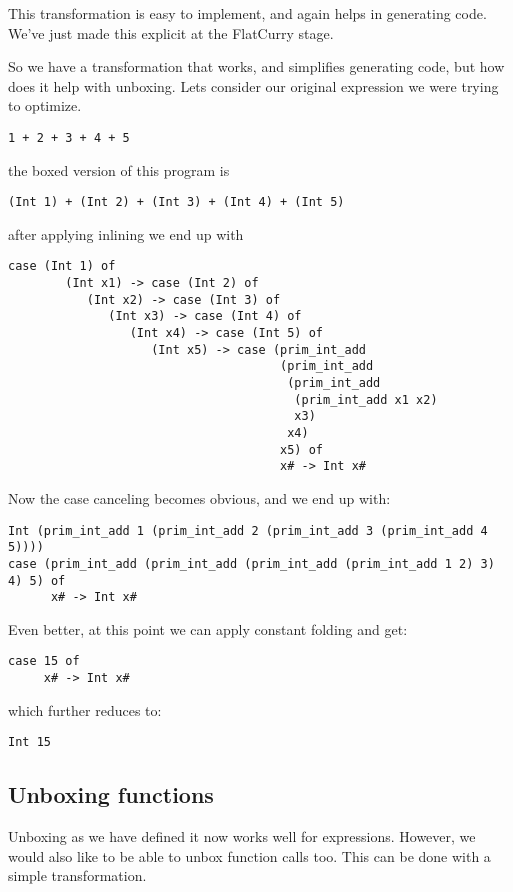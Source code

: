 \documentclass{article}
\begin{document}
This transformation is easy to implement, and again helps in generating code.
We've just made this explicit at the FlatCurry stage.

So we have a transformation that works, and simplifies generating code, but how does it help with unboxing.
Lets consider our original expression we were trying to optimize.


\begin{verbatim}
1 + 2 + 3 + 4 + 5
\end{verbatim}
the boxed version of this program is
\begin{verbatim}
(Int 1) + (Int 2) + (Int 3) + (Int 4) + (Int 5)
\end{verbatim}
after applying inlining we end up with
\begin{verbatim}
case (Int 1) of
        (Int x1) -> case (Int 2) of
           (Int x2) -> case (Int 3) of
              (Int x3) -> case (Int 4) of
                 (Int x4) -> case (Int 5) of
                    (Int x5) -> case (prim_int_add
                                      (prim_int_add
                                       (prim_int_add
                                        (prim_int_add x1 x2)
                                        x3)
                                       x4)
                                      x5) of
                                      x# -> Int x#
\end{verbatim}

Now the case canceling becomes obvious,
and we end up with:
\begin{verbatim}
Int (prim_int_add 1 (prim_int_add 2 (prim_int_add 3 (prim_int_add 4 5))))
case (prim_int_add (prim_int_add (prim_int_add (prim_int_add 1 2) 3) 4) 5) of
      x# -> Int x#
\end{verbatim}

Even better, at this point we can apply constant folding and get:
\begin{verbatim}
case 15 of
     x# -> Int x#
\end{verbatim}
which further reduces to:
\begin{verbatim}
Int 15
\end{verbatim}

\subsection*{Unboxing functions}

Unboxing as we have defined it now works well for expressions.
However, we would also like to be able to unbox function calls too.
This can be done with a simple transformation.
\end{document}
